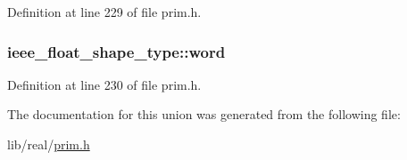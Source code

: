 Definition at line 229 of file prim.\+h.

\subsubsection[{\texorpdfstring{word}{word}}]{ ieee\+\_\+float\+\_\+shape\+\_\+type\+::word}\hypertarget{unionieee__float__shape__type_acc20fbdec65fd390a9eea66249564ffb}{}\label{unionieee__float__shape__type_acc20fbdec65fd390a9eea66249564ffb}


Definition at line 230 of file prim.\+h.



The documentation for this union was generated from the following file\+:\begin{DoxyCompactItemize}
\item 
lib/real/\hyperlink{real_2prim_8h}{prim.\+h}\end{DoxyCompactItemize}
